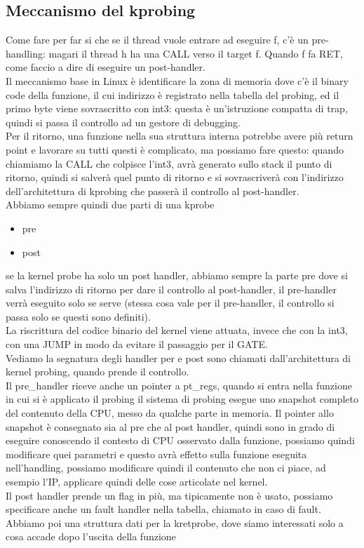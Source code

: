 \documentclass[12pt, oneside]{extbook}
\begin{document}
\subsection{Meccanismo del kprobing}
Come fare per far si che se il thread vuole entrare ad eseguire f, c'è un pre-handling: magari il thread h ha una CALL verso il target f. Quando f fa RET, come faccio a dire di eseguire un post-handler.\\Il meccanismo base in Linux è identificare la zona di memoria dove c'è il binary code della funzione, il cui indirizzo è registrato nella tabella del probing, ed il primo byte viene sovrascritto con int3: questa è un'istruzione compatta di trap, quindi si passa il controllo ad un gestore di debugging.\\Per il ritorno, una funzione nella sua struttura interna potrebbe avere più return point e lavorare su tutti questi è complicato, ma possiamo fare questo: quando chiamiamo la CALL che colpisce l'int3, avrà generato sullo stack il punto di ritorno, quindi si salverà quel punto di ritorno e si sovrascriverà con l'indirizzo dell'architettura di kprobing che passerà il controllo al post-handler.\\Abbiamo sempre quindi due parti di una kprobe
\begin{itemize}
\item pre
\item post
\end{itemize}
se la kernel probe ha solo un post handler, abbiamo sempre la parte pre dove si salva l'indirizzo di ritorno per dare il controllo al post-handler, il pre-handler verrà eseguito solo se serve (stessa cosa vale per il pre-handler, il controllo si passa solo se questi sono definiti).\\La riscrittura del codice binario del kernel viene attuata, invece che con la int3, con una JUMP in modo da evitare il passaggio per il GATE.\\Vediamo la segnatura degli handler per e post
sono chiamati dall'architettura di kernel probing, quando prende il controllo.\\Il pre\_handler riceve anche un pointer a pt\_regs, quando si entra nella funzione in cui si è applicato il probing il sistema di probing esegue uno snapshot completo del contenuto della CPU, messo da qualche parte in memoria. Il pointer allo snapshot è consegnato sia al pre che al post handler, quindi sono in grado di eseguire conoscendo il contesto di CPU osservato dalla funzione, possiamo quindi modificare quei parametri e questo avrà effetto sulla funzione eseguita nell'handling, possiamo modificare quindi il contenuto che non ci piace, ad esempio l'IP, applicare quindi delle cose articolate nel kernel.\\Il post handler prende un flag in più, ma tipicamente non è usato, possiamo specificare anche un fault handler nella tabella, chiamato in caso di fault.\\Abbiamo poi una struttura dati per la kretprobe, dove siamo interessati solo a cosa accade dopo l'uscita della funzione
\end{document}
